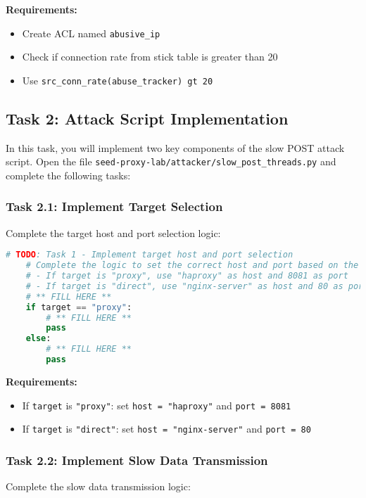 \documentclass[12pt]{article}
\begin{document}
    \textbf{Requirements:}
    \begin{itemize}
        \item Create ACL named \texttt{abusive\_ip}
        \item Check if connection rate from stick table is greater than 20
        \item Use \texttt{src\_conn\_rate(abuse\_tracker) gt 20}
    \end{itemize}

    \subsection{Task 2: Attack Script Implementation}

    In this task, you will implement two key components of the slow POST attack script. Open the file \texttt{seed-proxy-lab/attacker/slow\_post\_threads.py} and complete the following tasks:

    \subsubsection{Task 2.1: Implement Target Selection}
    Complete the target host and port selection logic:

    \begin{lstlisting}[language=python, caption=Attack Script - Task 2.1]
    # TODO: Task 1 - Implement target host and port selection
    # Complete the logic to set the correct host and port based on the target argument
    # - If target is "proxy", use "haproxy" as host and 8081 as port
    # - If target is "direct", use "nginx-server" as host and 80 as port
    # ** FILL HERE **
    if target == "proxy":
        # ** FILL HERE **
        pass
    else:
        # ** FILL HERE **
        pass
    \end{lstlisting}

    \textbf{Requirements:}
    \begin{itemize}
        \item If \texttt{target} is \texttt{"proxy"}: set \texttt{host = "haproxy"} and \texttt{port = 8081}
        \item If \texttt{target} is \texttt{"direct"}: set \texttt{host = "nginx-server"} and \texttt{port = 80}
    \end{itemize}

    \subsubsection{Task 2.2: Implement Slow Data Transmission}
    Complete the slow data transmission logic:
\end{document}
